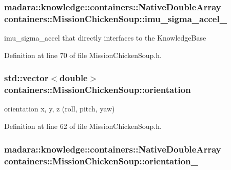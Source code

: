 \subsubsection[{\texorpdfstring{imu\+\_\+sigma\+\_\+accel\+\_\+}{imu_sigma_accel_}}]{\setlength{\rightskip}{0pt plus 5cm}madara\+::knowledge\+::containers\+::\+Native\+Double\+Array containers\+::\+Mission\+Chicken\+Soup\+::imu\+\_\+sigma\+\_\+accel\+\_\+\hspace{0.3cm}{\ttfamily [private]}}\hypertarget{classcontainers_1_1MissionChickenSoup_a2b9f1fc60c385728175ffb9c7bff5eab}{}\label{classcontainers_1_1MissionChickenSoup_a2b9f1fc60c385728175ffb9c7bff5eab}


imu\+\_\+sigma\+\_\+accel that directly interfaces to the Knowledge\+Base 



Definition at line 70 of file Mission\+Chicken\+Soup.\+h.

\subsubsection[{\texorpdfstring{orientation}{orientation}}]{\setlength{\rightskip}{0pt plus 5cm}std\+::vector$<$double$>$ containers\+::\+Mission\+Chicken\+Soup\+::orientation}\hypertarget{classcontainers_1_1MissionChickenSoup_a7bd730ab45b8c76c0f8378cffeb98205}{}\label{classcontainers_1_1MissionChickenSoup_a7bd730ab45b8c76c0f8378cffeb98205}


orientation x, y, z (roll, pitch, yaw) 



Definition at line 62 of file Mission\+Chicken\+Soup.\+h.

\subsubsection[{\texorpdfstring{orientation\+\_\+}{orientation_}}]{\setlength{\rightskip}{0pt plus 5cm}madara\+::knowledge\+::containers\+::\+Native\+Double\+Array containers\+::\+Mission\+Chicken\+Soup\+::orientation\+\_\+\hspace{0.3cm}{\ttfamily [private]}}\hypertarget{classcontainers_1_1MissionChickenSoup_a6ea3226a3a25d33dd84c1af6a6b5858c}{}\label{classcontainers_1_1MissionChickenSoup_a6ea3226a3a25d33dd84c1af6a6b5858c}


